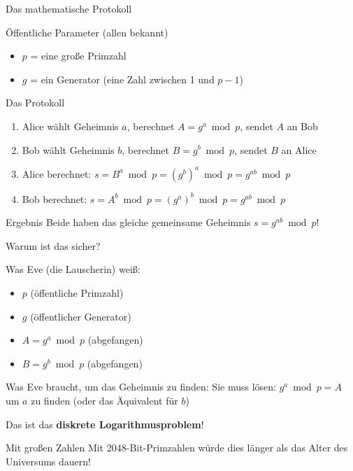 \documentclass[handout]{beamer}
\begin{document}
\begin{frame}{Das mathematische Protokoll}
\begin{block}{Öffentliche Parameter (allen bekannt)}
\begin{itemize}
    \item $p$ = eine große Primzahl
    \item $g$ = ein Generator (eine Zahl zwischen 1 und $p-1$)
\end{itemize}
\end{block}

\pause

\begin{block}{Das Protokoll}
\begin{enumerate}
    \item Alice wählt Geheimnis $a$, berechnet $A = g^a \bmod p$, sendet $A$ an Bob
    \item Bob wählt Geheimnis $b$, berechnet $B = g^b \bmod p$, sendet $B$ an Alice
    \item Alice berechnet: $s = B^a \bmod p = (g^b)^a \bmod p = g^{ab} \bmod p$
    \item Bob berechnet: $s = A^b \bmod p = (g^a)^b \bmod p = g^{ab} \bmod p$
\end{enumerate}
\end{block}

\pause

\begin{exampleblock}{Ergebnis}
Beide haben das gleiche gemeinsame Geheimnis $s = g^{ab} \bmod p$!
\end{exampleblock}
\end{frame}

\begin{frame}{Warum ist das sicher?}
\begin{block}{Was Eve (die Lauscherin) weiß:}
\begin{itemize}
    \item $p$ (öffentliche Primzahl)
    \item $g$ (öffentlicher Generator)
    \item $A = g^a \bmod p$ (abgefangen)
    \item $B = g^b \bmod p$ (abgefangen)
\end{itemize}
\end{block}

\pause

\begin{alertblock}{Was Eve braucht, um das Geheimnis zu finden:}
Sie muss lösen: $g^a \bmod p = A$ um $a$ zu finden (oder das Äquivalent für $b$)

Das ist das \textbf{diskrete Logarithmusproblem}!
\end{alertblock}

\pause

\begin{block}{Mit großen Zahlen}
Mit 2048-Bit-Primzahlen würde dies länger als das Alter des Universums dauern!
\end{block}
\end{frame}
\end{document}
